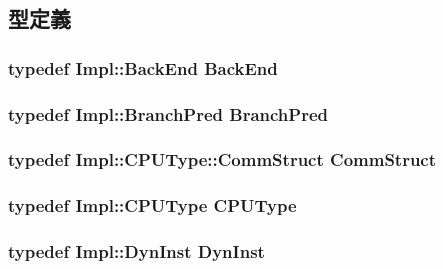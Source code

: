 \subsection{型定義}
\hypertarget{classFrontEnd_a3de526baa0cbb2b55bf669a6f7bf81cc}{
\subsubsection[{BackEnd}]{\setlength{\rightskip}{0pt plus 5cm}typedef Impl::BackEnd {\bf BackEnd}}}
\label{classFrontEnd_a3de526baa0cbb2b55bf669a6f7bf81cc}
\hypertarget{classFrontEnd_a25460b96f0b4cf1681e2c540a7a329eb}{
\subsubsection[{BranchPred}]{\setlength{\rightskip}{0pt plus 5cm}typedef Impl::BranchPred {\bf BranchPred}}}
\label{classFrontEnd_a25460b96f0b4cf1681e2c540a7a329eb}
\hypertarget{classFrontEnd_ab99b68ad737741b1d3a073f2df88752a}{
\subsubsection[{CommStruct}]{\setlength{\rightskip}{0pt plus 5cm}typedef Impl::CPUType::CommStruct {\bf CommStruct}}}
\label{classFrontEnd_ab99b68ad737741b1d3a073f2df88752a}
\hypertarget{classFrontEnd_ad0cc927c8534eaba1d99c29b2942311f}{
\subsubsection[{CPUType}]{\setlength{\rightskip}{0pt plus 5cm}typedef Impl::CPUType {\bf CPUType}}}
\label{classFrontEnd_ad0cc927c8534eaba1d99c29b2942311f}
\hypertarget{classFrontEnd_ab741745c86a14c765b999c11167636d9}{
\subsubsection[{DynInst}]{\setlength{\rightskip}{0pt plus 5cm}typedef Impl::DynInst {\bf DynInst}}}
